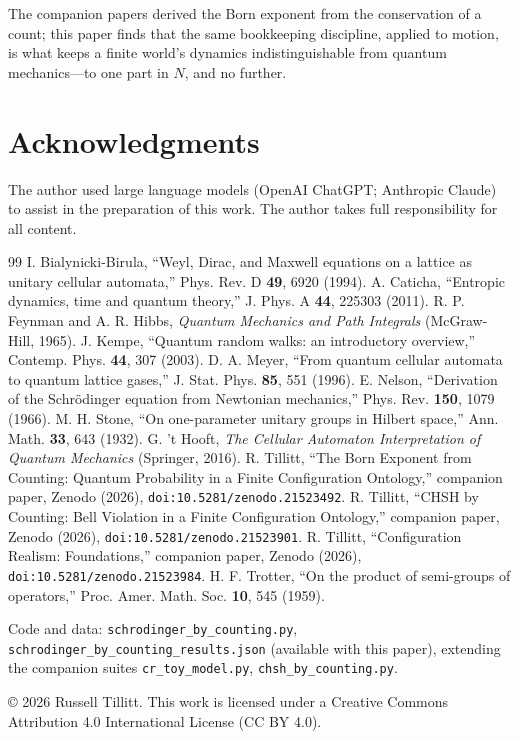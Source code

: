 \documentclass[11pt]{article}
\theoremstyle{definition}
\theoremstyle{remark}
\begin{document}
The companion papers derived the Born exponent from the conservation of a count; this paper finds that the same bookkeeping discipline, applied to motion, is what keeps a finite world's dynamics indistinguishable from quantum mechanics---to one part in $N$, and no further.

\section*{Acknowledgments}
The author used large language models (OpenAI ChatGPT; Anthropic Claude) to assist in the preparation of this work. The author takes full responsibility for all content.

\begin{thebibliography}{99}
 I. Bialynicki-Birula, ``Weyl, Dirac, and Maxwell equations on a lattice as unitary cellular automata,'' Phys. Rev. D \textbf{49}, 6920 (1994).
 A. Caticha, ``Entropic dynamics, time and quantum theory,'' J. Phys. A \textbf{44}, 225303 (2011).
 R. P. Feynman and A. R. Hibbs, \emph{Quantum Mechanics and Path Integrals} (McGraw-Hill, 1965).
 J. Kempe, ``Quantum random walks: an introductory overview,'' Contemp. Phys. \textbf{44}, 307 (2003).
 D. A. Meyer, ``From quantum cellular automata to quantum lattice gases,'' J. Stat. Phys. \textbf{85}, 551 (1996).
 E. Nelson, ``Derivation of the Schr\"odinger equation from Newtonian mechanics,'' Phys. Rev. \textbf{150}, 1079 (1966).
 M. H. Stone, ``On one-parameter unitary groups in Hilbert space,'' Ann. Math. \textbf{33}, 643 (1932).
 G. 't Hooft, \emph{The Cellular Automaton Interpretation of Quantum Mechanics} (Springer, 2016).
 R. Tillitt, ``The Born Exponent from Counting: Quantum Probability in a Finite Configuration Ontology,'' companion paper, Zenodo (2026), \texttt{doi:10.5281/zenodo.21523492}.
 R. Tillitt, ``CHSH by Counting: Bell Violation in a Finite Configuration Ontology,'' companion paper, Zenodo (2026), \texttt{doi:10.5281/zenodo.21523901}.
 R. Tillitt, ``Configuration Realism: Foundations,'' companion paper, Zenodo (2026), \texttt{doi:10.5281/zenodo.21523984}.
 H. F. Trotter, ``On the product of semi-groups of operators,'' Proc. Amer. Math. Soc. \textbf{10}, 545 (1959).
\end{thebibliography}

\vspace{1em}
\noindent\small Code and data: \texttt{schrodinger\_by\_counting.py}, \texttt{schrodinger\_by\_counting\_results.json} (available with this paper), extending the companion suites \texttt{cr\_toy\_model.py}, \texttt{chsh\_by\_counting.py}.

\vspace{0.5em}
\noindent\small \copyright{} 2026 Russell Tillitt. This work is licensed under a Creative Commons Attribution 4.0 International License (CC BY 4.0).
\end{document}
